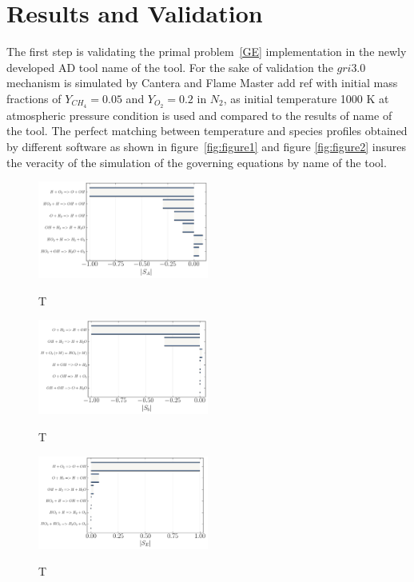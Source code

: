 \documentclass[preprint,review,12pt]{elsarticle}
\begin{document}
\section{Results and Validation}
The first step is validating the primal problem~\ref{GE} implementation in the newly developed AD tool  {\color{red} name of the tool}. For the sake of validation the $gri3.0$ mechanism is simulated by Cantera and Flame Master {\color{red} add ref} with initial mass fractions of $Y_{CH_4} = 0.05$ and $Y_{O_2} = 0.2$ in $N_2$, as initial temperature 1000 K at atmospheric pressure condition is used and compared to the results of {\color{red} name of the tool}. The perfect matching between temperature and species profiles obtained by different software as shown in figure~\ref{fig:figure1} and figure \ref{fig:figure2} insures the veracity of the simulation of the governing equations by {\color{red} name of the tool}.

         
\begin{figure}
\centering
 {\includegraphics[width=0.5\textwidth]{figures/H2_SA_Validation.pdf}}
\caption{T}
    \label{fig:figure3}
\end{figure}

\begin{figure}
\centering
 {\includegraphics[width=0.5\textwidth]{figures/H2_Sb_Validation.pdf}}
\caption{T}
    \label{fig:figure4}
\end{figure}

\begin{figure}
\centering
 {\includegraphics[width=0.5\textwidth]{figures/H2_SE_Validation.pdf}}
\caption{T}
    \label{fig:figure5}
\end{figure}
\end{document}
